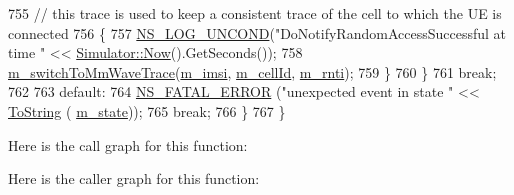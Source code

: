 \begin{DoxyCode}
755         \textcolor{comment}{// this trace is used to keep a consistent trace of the cell to which the UE is connected}
756         \{
757           \hyperlink{log-macros-disabled_8h_a0b36e5e182b37194f85ef1c5e979fb2e}{NS\_LOG\_UNCOND}(\textcolor{stringliteral}{"DoNotifyRandomAccessSuccessful at time "} << 
      \hyperlink{classns3_1_1Simulator_ac3178fa975b419f7875e7105be122800}{Simulator::Now}().GetSeconds());
758           \hyperlink{classns3_1_1LteUeRrc_a7639b7deb1468b3ba98c4c8731832597}{m\_switchToMmWaveTrace}(\hyperlink{classns3_1_1LteUeRrc_a1d825677309d17bdf729920f7dafd011}{m\_imsi}, \hyperlink{classns3_1_1LteUeRrc_aa9d3317734eea9158371d9fccf3a0c48}{m\_cellId}, 
      \hyperlink{classns3_1_1LteUeRrc_a8e078d8ef0ad23e670fe2ef08caab84f}{m\_rnti});
759         \}
760       \}
761       \textcolor{keywordflow}{break};
762 
763     \textcolor{keywordflow}{default}:
764       \hyperlink{group__fatal_ga5131d5e3f75d7d4cbfd706ac456fdc85}{NS\_FATAL\_ERROR} (\textcolor{stringliteral}{"unexpected event in state "} << \hyperlink{namespacens3_a3d1f7e1bec1972e2ae8d64673fcfcd9c}{ToString} (
      \hyperlink{classns3_1_1LteUeRrc_a81d711739d758a5add38b100086be632}{m\_state}));
765       \textcolor{keywordflow}{break}; 
766     \}
767 \}
\end{DoxyCode}


Here is the call graph for this function\+:




Here is the caller graph for this function\+:


